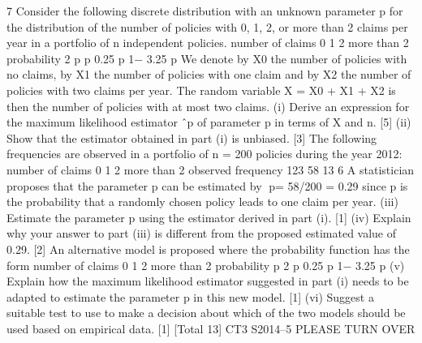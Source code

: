 
7 Consider the following discrete distribution with an unknown parameter p for the
distribution of the number of policies with 0, 1, 2, or more than 2 claims per year in a
portfolio of n independent policies.
number of claims 0 1 2 more than 2
probability 2 p p 0.25 p 1− 3.25 p
We denote by X0 the number of policies with no claims, by X1 the number of policies
with one claim and by X2 the number of policies with two claims per year. The
random variable X = X0 + X1 + X2 is then the number of policies with at most two
claims.
(i) Derive an expression for the maximum likelihood estimator ˆp of parameter p
in terms of X and n. [5]
(ii) Show that the estimator obtained in part (i) is unbiased. [3]
The following frequencies are observed in a portfolio of n = 200 policies during the
year 2012:
  number of claims 0 1 2 more than 2
observed frequency 123 58 13 6
A statistician proposes that the parameter p can be estimated by 􀀄p= 58/200 = 0.29
since p is the probability that a randomly chosen policy leads to one claim per year.
(iii) Estimate the parameter p using the estimator derived in part (i). [1]
(iv) Explain why your answer to part (iii) is different from the proposed estimated
value of 0.29. [2]
An alternative model is proposed where the probability function has the form
number of claims 0 1 2 more than 2
probability p 2 p 0.25 p 1− 3.25 p
(v) Explain how the maximum likelihood estimator suggested in part (i) needs to
be adapted to estimate the parameter p in this new model. [1]
(vi) Suggest a suitable test to use to make a decision about which of the two
models should be used based on empirical data. [1]
[Total 13]
CT3 S2014–5 PLEASE TURN OVER



